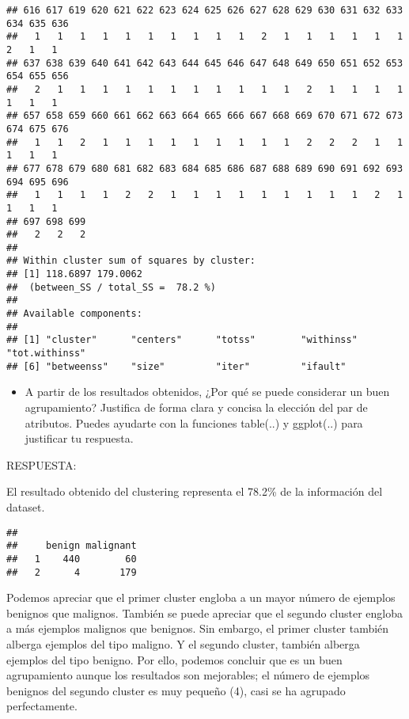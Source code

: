 \documentclass[
]{article}
\newenvironment{Shaded}{\begin{snugshade}}{\end{snugshade}}
\newcommand{\KeywordTok}[1]{\textcolor[rgb]{0.13,0.29,0.53}{\textbf{#1}}}
\newcommand{\NormalTok}[1]{#1}
\newcommand{\OperatorTok}[1]{\textcolor[rgb]{0.81,0.36,0.00}{\textbf{#1}}}
\providecommand{\tightlist}{%
  \setlength{\itemsep}{0pt}\setlength{\parskip}{0pt}}
\begin{document}
\begin{verbatim}
## 616 617 619 620 621 622 623 624 625 626 627 628 629 630 631 632 633 634 635 636 
##   1   1   1   1   1   1   1   1   1   1   2   1   1   1   1   1   1   2   1   1 
## 637 638 639 640 641 642 643 644 645 646 647 648 649 650 651 652 653 654 655 656 
##   2   1   1   1   1   1   1   1   1   1   1   1   2   1   1   1   1   1   1   1 
## 657 658 659 660 661 662 663 664 665 666 667 668 669 670 671 672 673 674 675 676 
##   1   1   2   1   1   1   1   1   1   1   1   1   2   2   2   1   1   1   1   1 
## 677 678 679 680 681 682 683 684 685 686 687 688 689 690 691 692 693 694 695 696 
##   1   1   1   1   2   2   1   1   1   1   1   1   1   1   1   2   1   1   1   1 
## 697 698 699 
##   2   2   2 
## 
## Within cluster sum of squares by cluster:
## [1] 118.6897 179.0062
##  (between_SS / total_SS =  78.2 %)
## 
## Available components:
## 
## [1] "cluster"      "centers"      "totss"        "withinss"     "tot.withinss"
## [6] "betweenss"    "size"         "iter"         "ifault"
\end{verbatim}

\begin{itemize}
\tightlist
\item
  A partir de los resultados obtenidos, ¿Por qué se puede considerar un
  buen agrupamiento? Justifica de forma clara y concisa la elección del
  par de atributos. Puedes ayudarte con la funciones table(..) y
  ggplot(..) para justificar tu respuesta.
\end{itemize}

RESPUESTA:

El resultado obtenido del clustering representa el 78.2\% de la
información del dataset.

\begin{Shaded}
\end{Shaded}

\begin{verbatim}
##    
##     benign malignant
##   1    440        60
##   2      4       179
\end{verbatim}

Podemos apreciar que el primer cluster engloba a un mayor número de
ejemplos benignos que malignos. También se puede apreciar que el segundo
cluster engloba a más ejemplos malignos que benignos. Sin embargo, el
primer cluster también alberga ejemplos del tipo maligno. Y el segundo
cluster, también alberga ejemplos del tipo benigno. Por ello, podemos
concluir que es un buen agrupamiento aunque los resultados son
mejorables; el número de ejemplos benignos del segundo cluster es muy
pequeño (4), casi se ha agrupado perfectamente.
\end{document}
